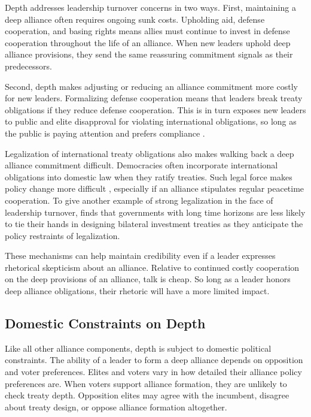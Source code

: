 \documentclass[12pt]{article}
\begin{document}
Depth addresses leadership turnover concerns in two ways. 
First, maintaining a deep alliance often requires ongoing sunk costs.
Upholding aid, defense cooperation, and basing rights means allies must continue to invest in defense cooperation throughout the life of an alliance. 
When new leaders uphold deep alliance provisions, they send the same reassuring commitment signals as their predecessors. 


Second, depth makes adjusting or reducing an alliance commitment more costly for new leaders. 
Formalizing defense cooperation means that leaders break treaty obligations if they reduce defense cooperation. 
This is in turn exposes new leaders to public and elite disapproval for violating international obligations, so long as the public is paying attention \citep{Slantchev2006, PotterBaum2014} and prefers compliance \citep{Chaudoin2014, KertzerBrutger2016}.


Legalization of international treaty obligations also makes walking back a deep alliance commitment difficult. 
Democracies often incorporate international obligations into domestic law when they ratify treaties.
Such legal force makes policy change more difficult \citep{Gaubatz1996, Leedsetal2009}, especially if an alliance stipulates regular peacetime cooperation. 
To give another example of strong legalization in the face of leadership turnover, \citet{Blake2013} finds that governments with long time horizons are less likely to tie their hands in designing bilateral investment treaties as they anticipate the policy restraints of legalization. 


These mechanisms can help maintain credibility even if a leader expresses rhetorical skepticism about an alliance. 
Relative to continued costly cooperation on the deep provisions of an alliance, talk is cheap. 
So long as a leader honors deep alliance obligations, their rhetoric will have a more limited impact. 



\subsection{Domestic Constraints on Depth} 

Like all other alliance components, depth is subject to domestic political constraints. 
The ability of a leader to form a deep alliance depends on opposition and voter preferences.
Elites and voters vary in how detailed their alliance policy preferences are. 
When voters support alliance formation, they are unlikely to check treaty depth.
Opposition elites may agree with the incumbent, disagree about treaty design, or oppose alliance formation altogether. 
\end{document}
